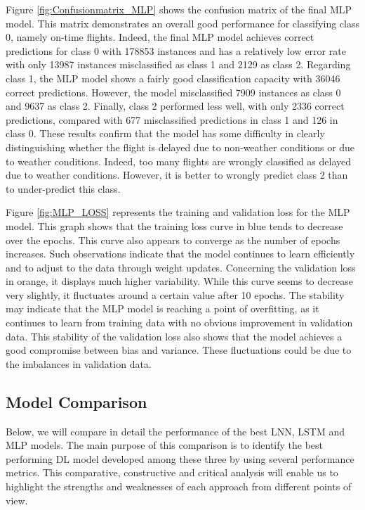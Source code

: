 \documentclass[12pt,oneside]{book} %
\begin{document}
\noindent Figure \ref{fig:Confusionmatrix_MLP} shows the confusion matrix of the final MLP model. This matrix demonstrates an overall good performance for classifying class 0, namely on-time flights. Indeed, the final MLP model achieves correct predictions for class 0 with 178853 instances and has a relatively low error rate with only 13987 instances misclassified as class 1 and 2129 as class 2. Regarding class 1, the MLP model shows a fairly good classification capacity with 36046 correct predictions. However, the model misclassified 7909 instances as class 0 and 9637 as class 2. Finally, class 2 performed less well, with only 2336 correct predictions, compared with 677 misclassified predictions in class 1 and 126 in class 0. These results confirm that the model has some difficulty in clearly distinguishing whether the flight is delayed due to non-weather conditions or due to weather conditions. Indeed, too many flights are wrongly classified as delayed due to weather conditions. However, it is better to wrongly predict class 2 than to under-predict this class.

\noindent Figure \ref{fig:MLP_LOSS} represents the training and validation loss for the MLP model. This graph shows that the training loss curve in blue tends to decrease over the epochs. This curve also appears to converge as the number of epochs increases. Such observations indicate that the model continues to learn efficiently and to adjust to the data through weight updates. Concerning the validation loss in orange, it displays much higher variability. While this curve seems to decrease very slightly, it fluctuates around a certain value after 10 epochs. The stability may indicate that the MLP model is reaching a point of overfitting, as it continues to learn from training data with no obvious improvement in validation data. This stability of the validation loss also shows that the model achieves a good compromise between bias and variance. These fluctuations could be due to the imbalances in validation data.

\subsection{Model Comparison}

\noindent Below, we will compare in detail the performance of the best LNN, LSTM and MLP models. The main purpose of this comparison is to identify the best performing DL model developed among these three by using several performance metrics. This comparative, constructive and critical analysis will enable us to highlight the strengths and weaknesses of each approach from different points of view.
\end{document}
